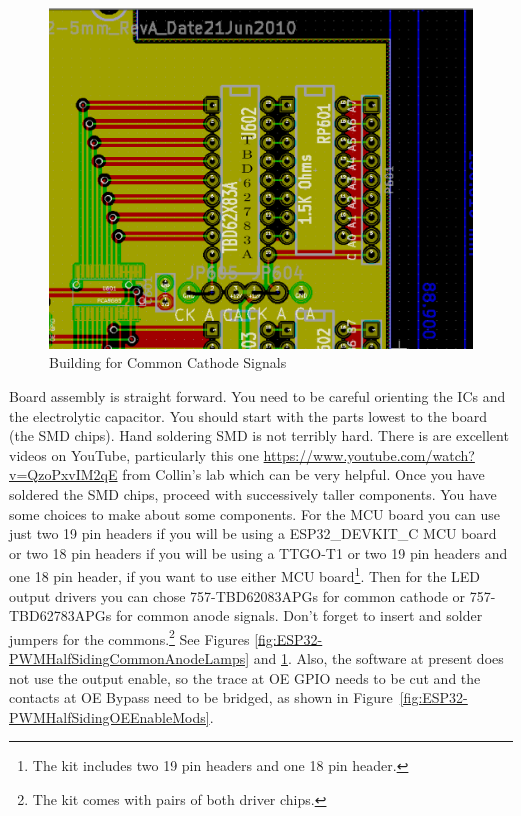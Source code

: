 \begin{figure}[hbpt]\begin{centering}%
\includegraphics[width=5in]{ESP32-PWMHalfSidingCommonCathodeLamps.png}
\caption{Building for Common Cathode Signals}
\label{fig:ESP32-PWMHalfSidingCommonCathodeLamps}
\end{centering}\end{figure} 
Board assembly is straight forward. You need to be careful orienting the ICs
and the electrolytic capacitor. You should start with the parts lowest to the
board (the SMD chips). Hand soldering SMD is not terribly hard. There is are
excellent videos on YouTube, particularly this one
\url{https://www.youtube.com/watch?v=QzoPxvIM2qE} from Collin's lab which can
be very helpful. Once you have soldered the SMD chips, proceed with
successively taller components. You have some choices to make about some
components. For the MCU board you can use just two 19 pin headers if you will
be using a ESP32\_DEVKIT\_C MCU board or two 18 pin headers if you will be
using a TTGO-T1 or two 19 pin headers and one 18 pin header, if you want to
use either MCU board\footnote{The kit includes two 19 pin headers and one 18
pin header.}. Then for the LED output drivers you can chose 757-TBD62083APGs
for common cathode or 757-TBD62783APGs for common anode signals. Don't forget
to insert and solder jumpers for the commons.\footnote{The kit comes with
pairs of both driver chips.}  See Figures 
\ref{fig:ESP32-PWMHalfSidingCommonAnodeLamps} and 
\ref{fig:ESP32-PWMHalfSidingCommonCathodeLamps}. Also, the software at present does not use the 
output enable, so the trace at OE GPIO needs to be cut and the contacts at OE 
Bypass need to be bridged, as shown in 
Figure~\ref{fig:ESP32-PWMHalfSidingOEEnableMods}.

